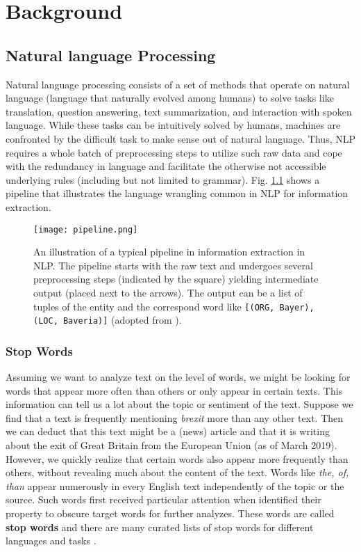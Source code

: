 \chapter{Background}

\section{Natural language Processing}
Natural language processing consists of a set of methods that operate on natural language (language that naturally evolved among humans) to solve tasks like translation, question answering, text summarization, and interaction with spoken language. While these tasks can be intuitively solved by humans, machines are confronted by the difficult task to make sense out of natural language. Thus, NLP requires a whole batch of preprocessing steps to utilize such raw data and cope with the redundancy in language and facilitate the otherwise not accessible underlying rules (including but not limited to grammar). Fig. \ref{fig:pipeline} shows a pipeline that illustrates the language wrangling common in NLP for information extraction.

\begin{figure}[h!]
    \centering
    \texttt{[image: pipeline.png]}
    \caption{An illustration of a typical pipeline in information extraction in NLP. The pipeline starts with the raw text and undergoes several preprocessing steps (indicated by the square) yielding intermediate output (placed next to the arrows). The output can be a list of tuples of the entity and the correspond word like \texttt{[(ORG, \textquotesingle Bayer\textquotesingle), (LOC, \textquotesingle Baveria\textquotesingle)]} (adopted from \citep{Bird2009}).}
    \label{fig:pipeline}
\end{figure}

\subsection{Stop Words}
Assuming we want to analyze text on the level of words, we might be looking for
words that appear more often than others or only appear in certain texts.
This information can tell us a lot about the topic or sentiment of the text.
Suppose we find that a text is frequently mentioning \textit{brexit} more than any other text.
Then we can deduct that this text might be a (news) article and that it is writing about the exit of Great Britain from the European Union (as of March 2019).
However, we quickly realize that certain words also appear more frequently than others, without revealing much about the content of the text.
Words like \textit{the, of, than} appear numerously in every English text independently of the topic or the source.
Such words first received particular attention when \cite{Luhn1960}  identified their property to obscure target words for further analyzes.
These words are called \textbf{stop words} and there are many curated lists of stop words for different languages and tasks \citep{RANKS2019}.

